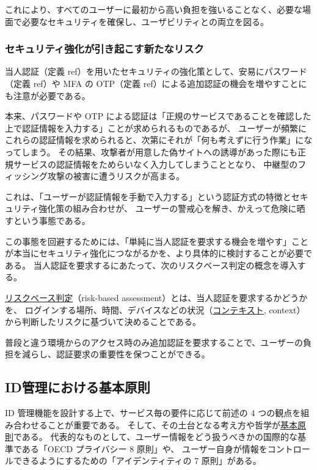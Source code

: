 \documentclass[uplatex]{jsarticle}
\def\ref#1{ref}%
\def\label#1{}%
\begin{document}
これにより、すべてのユーザーに最初から高い負担を強いることなく、必要な場面で必要なセキュリティを確保し、ユーザビリティとの両立を図る。

\subsubsection{セキュリティ強化が引き起こす新たなリスク}

当人認証（定義 \ref{dfn:authentication}）を用いたセキュリティの強化策として、安易にパスワード（定義 \ref{dfn:password-auth}）や
MFA の OTP（定義 \ref{dfn:otp-auth}）による追加認証の機会を増やすことにも注意が必要である。

本来、パスワードや OTP による認証は「正規のサービスであることを確認した上で認証情報を入力する」ことが求められるものであるが、
ユーザーが頻繁にこれらの認証情報を求められると、次第にそれが「何も考えずに行う作業」になってしまう。
その結果、攻撃者が用意した偽サイトへの誘導があった際にも正規サービスの認証情報をためらいなく入力してしまうこととなり、
中継型のフィッシング攻撃の被害に遭うリスクが高まる。

\begin{rem}[認証方式と強化策の組み合わせによる危険]\label{rem:ch5-manual-input-risk}
これは、「ユーザーが認証情報を手動で入力する」という認証方式の特徴とセキュリティ強化策の組み合わせが、
ユーザーの警戒心を解き、かえって危険に晒すという事態である。
\end{rem}

この事態を回避するためには、「単純に当人認証を要求する機会を増やす」ことが本当にセキュリティ強化につながるかを、より具体的に検討することが必要である。
当人認証を要求するにあたって、次のリスクベース判定の概念を導入する。

\begin{dfn}[リスクベース判定]\label{dfn:ch5-risk-based}
\underline{リスクベース判定}（risk-based assessment）とは、当人認証を要求するかどうかを、
ログインする場所、時間、デバイスなどの状況（\underline{コンテキスト}, context）から判断したリスクに基づいて決めることである。
\end{dfn}

普段と違う環境からのアクセス時のみ追加認証を要求することで、ユーザーの負担を減らし、認証要求の重要性を保つことができる。

\subsection{ID管理における基本原則}

ID 管理機能を設計する上で、サービス毎の要件に応じて前述の 4 つの観点を組み合わせることが重要である。
そして、その土台となる考え方や哲学が\underline{基本原則}である。
代表的なものとして、ユーザー情報をどう扱うべきかの国際的な基準である「OECD プライバシー 8 原則」や、
ユーザー自身が情報をコントロールできるようにするための「アイデンティティの 7 原則」がある。
\end{document}

